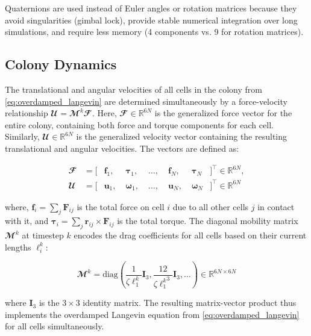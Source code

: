 \documentclass[conference]{IEEEtran}
\begin{document}
Quaternions are used instead of Euler angles or rotation matrices because they avoid singularities (gimbal lock), provide stable numerical integration over long simulations, and require less memory (4 components vs. 9 for rotation matrices).

\subsection{Colony Dynamics}

The translational and angular velocities of all cells in the colony from \autoref{eq:overdamped_langevin} are determined simultaneously by a force-velocity relationship $\mathbfcal{U} = \mathbfcal{M}^k \mathbfcal{F}$. Here, $\mathbfcal{F} \in \mathbb{R}^{6N}$ is the generalized force vector for the entire colony, containing both force and torque components for each cell. Similarly, $\mathbfcal{U} \in \mathbb{R}^{6N}$ is the generalized velocity vector containing the resulting translational and angular velocities. The vectors are defined as:

\begin{equation}
    \begin{alignedat}{5}
        \mathbfcal{F} &= [&\mathbf{f}_1,&\;\boldsymbol{\tau}_1,&\;\dots,&\;\mathbf{f}_N,&\;\boldsymbol{\tau}_N&]^\top \in \mathbb{R}^{6N}, \\
        \mathbfcal{U} &= [&\mathbf{u}_1,&\;\boldsymbol{\omega}_1,&\;\dots,&\;\mathbf{u}_N,&\;\boldsymbol{\omega}_N&]^\top \in \mathbb{R}^{6N}
    \end{alignedat}
\end{equation}

where, $\mathbf{f}_i = \sum_j \mathbf{F}_{ij}$ is the total force on cell $i$ due to all other cells $j$ in contact with it, and $\boldsymbol{\tau}_i = \sum_j \mathbf{r}_{ij} \times \mathbf{F}_{ij}$ is the total torque. The diagonal mobility matrix $\mathbfcal{M}^k$ at timestep $k$ encodes the drag coefficients for all cells based on their current lengths $\ell_i^k$:

\begin{equation}
    \mathbfcal{M}^k = \text{diag}\left(\frac{1}{\zeta \ell_1^k}\mathbf{I}_3, \frac{12}{\zeta {\ell_1^k}^3}\mathbf{I}_3, \dots \right) \in \mathbb{R}^{6N \times 6N}
\end{equation}

where $\mathbf{I}_3$ is the $3 \times 3$ identity matrix. The resulting matrix-vector product thus implements the overdamped Langevin equation from \autoref{eq:overdamped_langevin} for all cells simultaneously.
\end{document}
